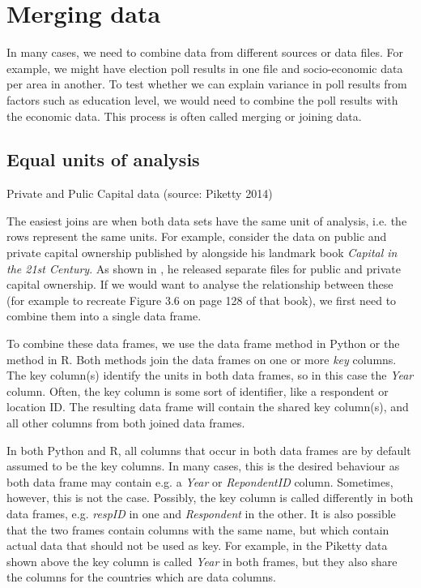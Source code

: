 \section{Merging data}
\label{sec:join}

In many cases, we need to combine data from different sources or data files.
For example, we might have election poll results in one file and socio-economic data per area in another.
To test whether we can explain variance in poll results from factors such as education level,
we would need to combine the poll results with the economic data.
This process is often called merging or joining data.

\subsection{Equal units of analysis}


\begin{ccsexample}
\caption{Private and Pulic Capital data (source: Piketty 2014)}\label{ex:piketty}
\end{ccsexample}


The easiest joins are when both data sets have the same unit of analysis,
i.e. the rows represent the same units.
For example, consider the data on public and private capital ownership published by
\cite{piketty} alongside his landmark book \emph{Capital in the 21st Century}.
As shown in , he released separate files for public and private capital ownership.
If we would want to analyse the relationship between these (for example to recreate Figure 3.6 on page 128 of that book),
we first need to combine them into a single data frame.

To combine these data frames, we use the  data frame method  in Python or the  method  in R.
Both methods join the data frames on one or more \emph{key} columns.
The key column(s) identify the units in both data frames, so in this case the \emph{Year} column.
Often, the key column is some sort of identifier, like a respondent or location ID.
The resulting data frame will contain the shared key column(s), and all other columns from both joined data frames.

In both Python and R, all columns that occur in both data frames are by default assumed to be the key columns.
In many cases, this is the desired behaviour as both data frame may contain e.g. a \emph{Year} or \emph{RepondentID} column.
Sometimes, however, this is not the case.
Possibly, the key column is called differently in both data frames, e.g. \emph{respID} in one and \emph{Respondent} in the other. 
It is also possible that the two frames contain columns with the same name,
but which contain actual data that should not be used as key.
For example, in the Piketty data shown above the key column is called \emph{Year} in both frames,
but they also share the columns for the countries which are data columns.

